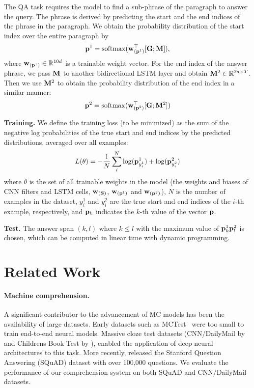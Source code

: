 \documentclass{article} \usepackage{iclr2017_conference,times}
\begin{document}
The QA task requires the model to find a sub-phrase of the paragraph to answer the query. The phrase is derived by predicting the start and the end indices of the phrase in the paragraph. We obtain the probability distribution of the start index over the entire paragraph by
\begin{equation}
{\bf p}^{1} = \mathrm{softmax}({\bf w}_{({\bf p}^1)}^\top[{\bf G};{\bf M}]),
\end{equation}
where ${\bf w}_{({\bf p}^1)} \in \mathbb{R}^{10d}$ is a trainable weight vector.
For the end index of the answer phrase, we pass ${\bf M}$ to another bidirectional LSTM layer and obtain ${\bf M}^2 \in \mathbb{R}^{2d \times T}$.
Then we use ${\bf M}^2$ to obtain the probability distribution of the end index in a similar manner:
\begin{equation}
{\bf p}^{2} = \mathrm{softmax}({\bf w}_{({\bf p}^2)}^\top[{\bf G};{\bf M}^2])
\end{equation}

\textbf{Training.}
We define the training loss (to be minimized) as the sum of the negative log probabilities of the true start and end indices by the predicted distributions, averaged over all examples:
\begin{equation}
L(\theta) = -\frac{1}{N}\sum^N_i \log({\bf p}^1_{y^1_i}) + \log({\bf p}^2_{y^2_i})
\end{equation}
where $\theta$ is the set of all trainable weights in the model (the weights and biases of CNN filters and LSTM cells, ${\bf w}_{({\bf S})}$, ${\bf w}_{({\bf p}^1)}$ and ${\bf w}_{({\bf p}^2)}$),
$N$ is the number of examples in the dataset,
$y^1_i$ and $y^2_i$ are the true start and end indices of the $i$-th example, respectively,
and ${\bf p}_k$ indicates the $k$-th value of the vector ${\bf p}$.

\textbf{Test.}
The answer span $(k, l)$ where $k \leq l$ with the maximum value of ${\bf p}^1_k {\bf p}^2_l$ is chosen, which can be computed in linear time with dynamic programming. 
\section{Related Work}\label{sec:related}
\paragraph{Machine comprehension.}
A significant contributor to the advancement of MC models has been the availability of large datasets. Early datasets such as MCTest~\citep{richardson2013mctest} were too small to train end-to-end neural models. 
Massive cloze test datasets (CNN/DailyMail by \citet{Hermann2015TeachingMT} and Childrens Book Test by \cite{hill2015goldilocks}), enabled the application of deep neural architectures to this task. 
More recently, \citet{rajpurkar2016squad} released the Stanford Question Answering (SQuAD) dataset with over 100,000 questions. We evaluate the performance of our comprehension system on both SQuAD and CNN/DailyMail datasets. 
\end{document}
